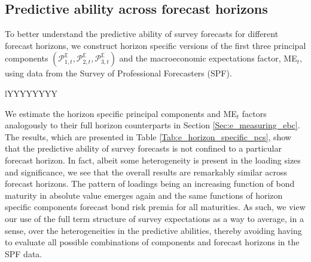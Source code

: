 \documentclass[12pt,letterpaper,leqno,doublespacing]{article}
\begin{document}
\begin{appendices}
\section{Predictive ability across forecast horizons}\label{sec:predictive_ability_across_forecast_horizons}
To better understand the predictive ability of survey forecasts for different forecast horizons, we construct horizon specific versions of the first three principal components $\left(\mathcal{P}_{1,t}^{\mathbb{E}},\mathcal{P}_{2,t}^{\mathbb{E}},\mathcal{P}_{3,t}^{\mathbb{E}}\right)$ and the macroeconomic expectations factor, ME$_{t}$, using data from the Survey of Professional Forecasters (SPF).
\begin{table}[htbp]
    \footnotesize
    \caption{
        \textbf{Predictive ability across forecast horizons.} \newline
        This table reports slope estimates from regressing one-year ahead bond risk premia upon horizon specific versions of the first three principal components ($\mathcal{P}_{1,t}^{\mathbb{E}}$,$\mathcal{P}_{2,t}^{\mathbb{E}}$,$\mathcal{P}_{3,t}^{\mathbb{E}}$) of the Survey of Professional Forecasters (SPF) forecasts and expected business conditions $\left(\text{ME}_{t}\right)$. Although not reported, all regressions contain an intercept. \cite{HansenHodrick1980} t-statistics implemented with four lags are presented in parentheses. Adj. R$^{2}\left(\%\right)$ denotes the full sample adjusted coefficient of determination in percentage. The sample period starts in 1968:Q4 and ends in 2014:Q4.
    }
    \centering
    \begin{tabularx}{\textwidth}{lYYYYYYYY}
        \toprule
        
        \bottomrule
        \label{Tab:e_horizon_specific_pcs}
    \end{tabularx}
\end{table}
We estimate the horizon specific principal components and ME$_{t}$ factors analogously to their full horizon counterparts in Section \ref{Sec:e_measuring_ebc}. The results, which are presented in Table \ref{Tab:e_horizon_specific_pcs}, show that the predictive ability of survey forecasts is not confined to a particular forecast horizon. In fact, albeit some heterogeneity is present in the loading sizes and significance, we see that the overall results are remarkably similar across forecast horizons. The pattern of loadings being an increasing function of bond maturity in absolute value emerges again and the same functions of horizon specific components forecast bond risk premia for all maturities. As such, we view our use of the full term structure of survey expectations as a way to average, in a sense, over the heterogeneities in the predictive abilities, thereby avoiding having to evaluate all possible combinations of components and forecast horizons in the SPF data. 


\end{appendices}
\end{document}

